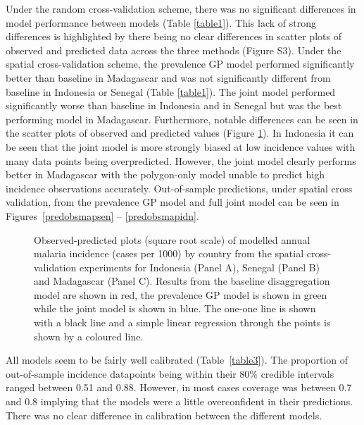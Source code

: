 \documentclass{statsoc}
\begin{document}
Under the random cross-validation scheme, there was no significant differences in model performance between models (Table \ref{table1}).
This lack of strong differences is highlighted by there being no clear differences in scatter plots of observed and predicted data across the three methods (Figure S3).
Under the spatial cross-validation scheme, the prevalence GP model performed significantly better than baseline in Madagascar and was not significantly different from baseline in Indonesia or Senegal (Table \ref{table1}).
The joint model performed significantly worse than baseline in Indonesia and in Senegal but was the best performing model in Madagascar.
Furthermore, notable differences can be seen in the scatter plots of observed and predicted values (Figure \ref{spatial2predobspolyfacet}).
In Indonesia it can be seen that the joint model is more strongly biased at low incidence values with many data points being overpredicted.
However, the joint model clearly performs better in Madagascar with the polygon-only model unable to predict high incidence observations accurately.
Out-of-sample predictions, under spatial cross validation, from the prevalence GP model and full joint model can be seen in Figures~\ref{predobsmapsen} -- \ref{predobsmapidn}.


\begin{figure}
\caption{\label{spatial2predobspolyfacet} 
Observed-predicted plots (square root scale) of modelled annual malaria incidence (cases per 1000) by country from the spatial cross-validation experiments for Indonesia (Panel A), Senegal (Panel B) and Madagascar (Panel C). 
Results from the baseline disaggregation model are shown in red, the prevalence GP model is shown in green while the joint model is shown in blue.
The one-one line is shown with a black line and a simple linear regression through the points is shown by a coloured line.
}

\end{figure}



All models seem to be fairly well calibrated (Table~\ref{table3}).
The proportion of out-of-sample incidence datapoints being within their 80\% credible intervals ranged between 0.51 and 0.88.
However, in most cases coverage was between 0.7 and 0.8 implying that the models were a little overconfident in their predictions.
There was no clear difference in calibration between the different models.
\end{document}
